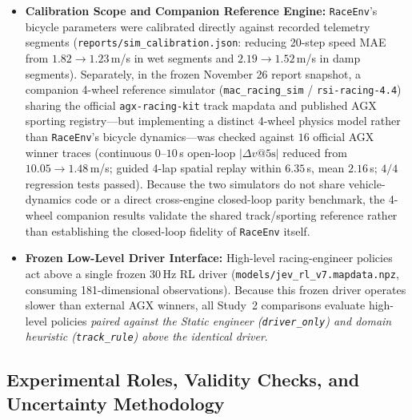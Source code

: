 \documentclass[11pt,a4paper]{article}
\begin{document}
\begin{itemize}[leftmargin=1.5em,itemsep=2pt]
  \item \textbf{Calibration Scope and Companion Reference Engine:} \texttt{RaceEnv}'s bicycle parameters were calibrated directly against recorded telemetry segments (\texttt{reports/sim\_calibration.json}: reducing 20-step speed MAE from $1.82 \rightarrow 1.23$\,m/s in wet segments and $2.19 \rightarrow 1.52$\,m/s in damp segments). Separately, in the frozen November 26 report snapshot, a companion 4-wheel reference simulator (\texttt{mac\_racing\_sim} / \texttt{rsi-racing-4.4}) sharing the official \texttt{agx-racing-kit} track mapdata and published AGX sporting registry---but implementing a distinct 4-wheel physics model rather than \texttt{RaceEnv}'s bicycle dynamics---was checked against $16$ official AGX winner traces (continuous $0$--$10$\,s open-loop $|\Delta v\text{@}5\text{s}|$ reduced from $10.05 \rightarrow 1.48$\,m/s; guided 4-lap spatial replay within $6.35$\,s, mean $2.16$\,s; $4/4$ regression tests passed). Because the two simulators do not share vehicle-dynamics code or a direct cross-engine closed-loop parity benchmark, the 4-wheel companion results validate the shared track/sporting reference rather than establishing the closed-loop fidelity of \texttt{RaceEnv} itself.
  \item \textbf{Frozen Low-Level Driver Interface:} High-level racing-engineer policies act above a single frozen 30\,Hz RL driver (\texttt{models/jev\_rl\_v7.mapdata.npz}, consuming 181-dimensional observations). Because this frozen driver operates slower than external AGX winners, all Study~2 comparisons evaluate high-level policies \emph{paired against the Static engineer (\texttt{driver\_only}) and domain heuristic (\texttt{track\_rule}) above the identical driver}.
\end{itemize}

\subsection{Experimental Roles, Validity Checks, and Uncertainty Methodology}
\end{document}
